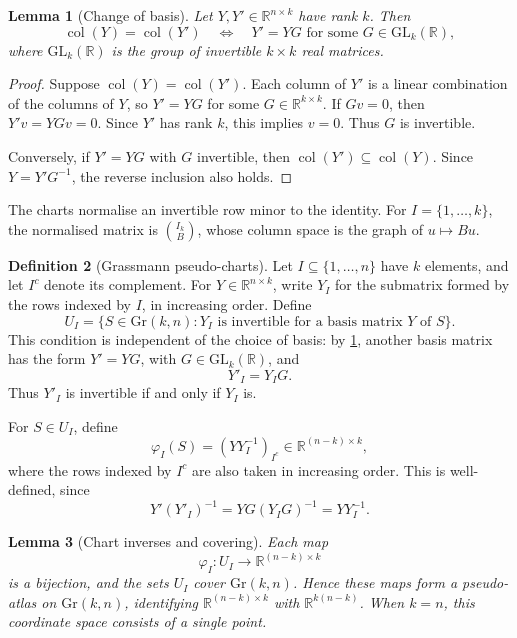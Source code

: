 \documentclass[12pt]{article}
\theoremstyle{definition}
\newtheorem{definition}{Definition}[section]
\theoremstyle{plain}
\newtheorem{lemma}[definition]{Lemma}
\theoremstyle{remark}
\newcommand{\R}{\mathbb{R}}
\newcommand{\Gr}{\mathrm{Gr} (k,n)}
\newcommand{\GL}{\mathrm{GL}}                %
\DeclareMathOperator{\col}{col}              %
\begin{document}
\begin{lemma}[Change of basis]\label{lem:grassmann-change-basis}
  Let \( Y,Y' \in \R^{n \times k} \) have rank \( k \).
  Then
  \[
    \col(Y) = \col(Y') \quad \Longleftrightarrow \quad Y'=YG \text{ for some } G \in \GL_k(\R),
  \]
  where \( \GL_k(\R) \) is the group of invertible \( k \times k \) real matrices.
\end{lemma}

\begin{proof}
  Suppose \( \col(Y) = \col(Y') \). Each column of \( Y' \) is a linear combination of the columns of \( Y \), so \( Y'=YG \) for some \( G \in \R^{k \times k} \).
  If \( Gv=0 \), then \( Y'v=YGv=0 \). Since \( Y' \) has rank \( k \), this implies \( v=0 \).
  Thus \( G \) is invertible.

  Conversely, if \( Y'=YG \) with \( G \) invertible, then \( \col(Y') \subseteq \col(Y) \).
  Since \( Y=Y'G^{-1} \), the reverse inclusion also holds.
\end{proof}

The charts normalise an invertible row minor to the identity.
For \( I=\{1,\dots,k\} \), the normalised matrix is \( \binom{I_k}{B} \), whose column space is the graph of \( u\mapsto Bu \).

\begin{definition}[Grassmann pseudo-charts]\label{def:grassmann-charts}
  Let \( I \subseteq \{1,\dots,n\} \) have \( k \) elements, and let \( I^c \) denote its complement.
  For \( Y \in \R^{n \times k} \), write \( Y_I \) for the submatrix formed by the rows indexed by \( I \), in increasing order.
  Define
  \[
    U_I = \{S \in \Gr : Y_I \text{ is invertible
    for a basis matrix } Y \text{ of } S\}.
  \]
  This condition is independent of the choice of basis:
  by \cref{lem:grassmann-change-basis}, another basis matrix has the form \( Y'=YG \), with \( G \in \GL_k(\R) \), and
  \[
    Y'_I = Y_I G.
  \]
  Thus \( Y'_I \) is invertible if and only if \( Y_I \) is.

  For \( S \in U_I \), define
  \[
    \varphi_I(S) = (YY_I^{-1})_{I^c} \in \R^{(n-k)\times k},
  \]
  where the rows indexed by \( I^c \) are also taken in increasing order.
  This is well-defined, since
  \[
    Y'(Y'_I)^{-1} = YG(Y_I G)^{-1} = YY_I^{-1}.
  \]
\end{definition}

\begin{lemma}[Chart inverses and covering]\label{lem:grassmann-chart-cover}
  Each map
  \[
    \varphi_I : U_I \longrightarrow \R^{(n-k)\times k}
  \]
  is a bijection, and the sets \( U_I \) cover \( \Gr \).
  Hence these maps form a pseudo-atlas on \( \Gr \), identifying \( \R^{(n-k)\times k} \) with \( \R^{k(n-k)} \).
  When \( k=n \), this coordinate space consists of a single point.
\end{lemma}
\end{document}
